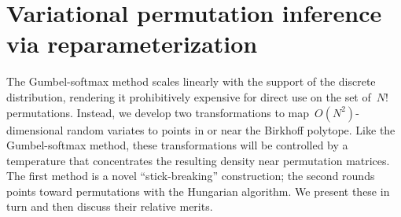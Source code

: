 \documentclass[twoside]{article}
\begin{document}
\section{Variational permutation inference via reparameterization}
\label{sec:permutation}
  

The Gumbel-softmax method scales linearly with the support of the
discrete distribution, rendering it prohibitively expensive for direct
use on the set of~$N!$ permutations.  Instead, we develop two
transformations to map~$O(N^2)$-dimensional random variates to points in
or near the Birkhoff polytope.  Like the Gumbel-softmax method, these
transformations will be controlled by a temperature that concentrates
the resulting density near permutation matrices.  The first method is
a novel ``stick-breaking'' construction; the second rounds points
toward permutations with the Hungarian algorithm.  We present these in
turn and then discuss their relative merits. 
\end{document}
